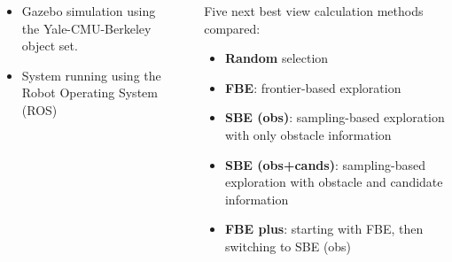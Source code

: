 
\begin{columns}[t,totalwidth=\twocolwid]

\begin{column}{\onecolwid}

	\vspace{1cm}

	\large{
		\begin{itemize}\itemsep48pt
			\item Gazebo simulation using the Yale-CMU-Berkeley object set\cite{calli2015benchmarking}.
			\item System running using the Robot Operating System (ROS)
		\end{itemize}}

\end{column}

\begin{column}{\sepwid}
\end{column} %

\begin{column}{\onecolwid}
	\large{
		Five next best view calculation methods compared:
			\begin{itemize}
				\item \textbf{Random} selection
				\item \textbf{FBE}: frontier-based exploration
				\item \textbf{SBE (obs)}: sampling-based exploration with only obstacle information
				\item \textbf{SBE (obs+cands)}: sampling-based exploration with obstacle and candidate information
				\item \textbf{FBE plus}: starting with FBE, then switching to SBE (obs)
			\end{itemize}}
\end{column}
\end{columns}


